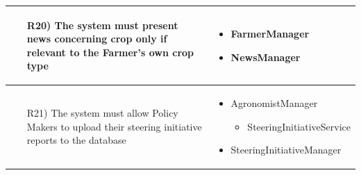 \documentclass[table, 12pt]{article}
\begin{document}
\begin{longtable}{|p{}|p{}|}
    \begin{itemize}
        \item[R20)] The system must present news concerning crop only if relevant to the Farmer's own crop type 
    \end{itemize}
    &
    \begin{itemize}
        \item FarmerManager
        \item NewsManager
    \end{itemize}
    \\\hline
    \begin{itemize}
        \item[R21)] The system must allow Policy Makers to upload their steering initiative reports to the database 
    \end{itemize}
    &
    \begin{itemize}
        \item AgronomistManager
        \begin{itemize}
            \item SteeringInitiativeService
        \end{itemize}
        \item SteeringInitiativeManager
    \end{itemize}\\\hline
\end{longtable}
\end{document}
